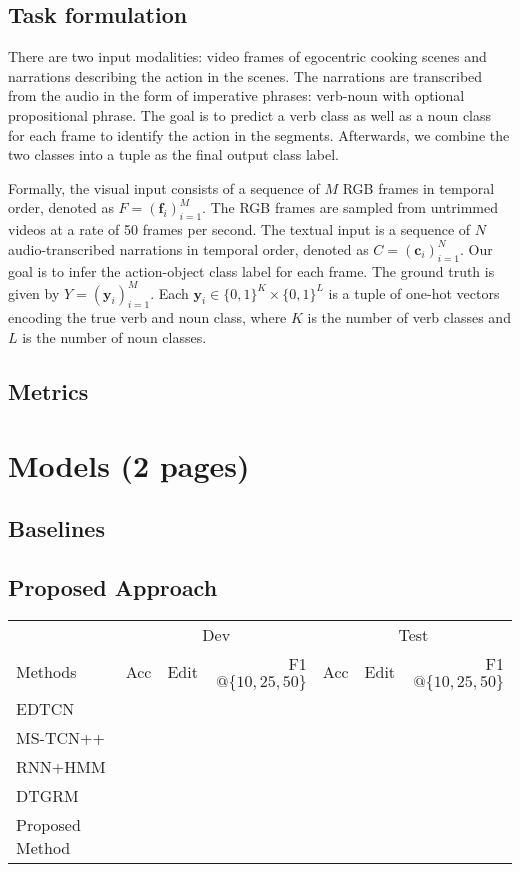 \documentclass[11pt,a4paper]{article}
\begin{document}
\subsection{Task formulation}
There are two input modalities: video frames of egocentric cooking scenes and narrations describing the action in the scenes. The narrations are transcribed from the audio in the form of imperative phrases: verb-noun with optional propositional phrase. The goal is to predict a verb class as well as a noun class for each frame to identify the action in the segments. Afterwards, we combine the two classes into a tuple as the final output class label. 

Formally, the visual input consists of a sequence of $M$ RGB frames in temporal order, denoted as $F=(\mathbf{f}_i)_{i=1}^M$. The RGB frames are sampled from untrimmed videos at a rate of 50 frames per second. The textual input is a sequence of $N$ audio-transcribed narrations in temporal order, denoted as $C=(\mathbf{c}_i)_{i=1}^N$. Our goal is to infer the action-object class label for each frame. The ground truth is given by $Y=(\mathbf{y}_i)_{i=1}^M$. Each $\mathbf{y}_i\in\{0,1\}^K\times\{0,1\}^L$ is a tuple of one-hot vectors encoding the true verb and noun class, where $K$ is the number of verb classes and $L$ is the number of noun classes.





\subsection{Metrics}



\clearpage
\section{Models (2 pages)}

\subsection{Baselines}



\subsection{Proposed Approach}

\clearpage
\begin{table*}[t]
\centering
\begin{tabular}{lrrrrrr}
\toprule
& \multicolumn{3}{c}{Dev} & \multicolumn{3}{c}{Test}\\
Methods  & Acc & Edit & F1$@\{10,25,50\}$ & Acc & Edit & F1$@\{10,25,50\}$ \\
\midrule
EDTCN \cite{8099596} & & & & & & \\
MS-TCN++ \cite{8953830} & & & & & & \\
RNN+HMM \cite{8099623} & & & & & & \\
DTGRM \cite{wang2020temporal} & & & & & & \\
\midrule
Proposed Method             & & & & \\
\bottomrule
\end{tabular}
\end{table*}
\end{document}
